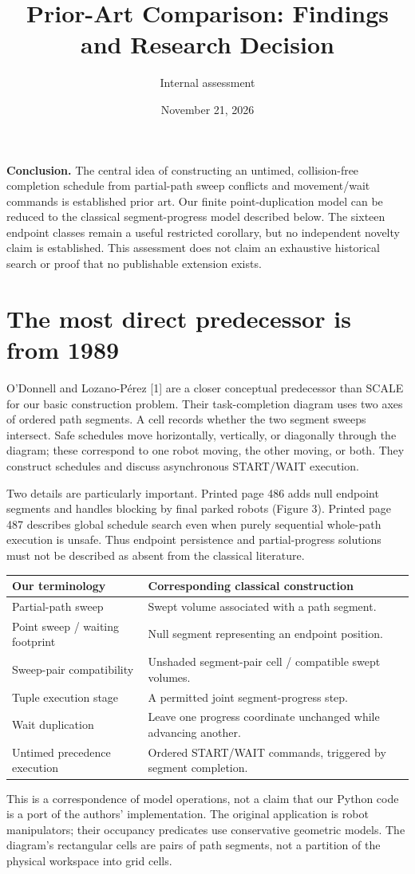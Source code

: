 \documentclass[11pt,a4paper]{article}
\title{Prior-Art Comparison: Findings and Research Decision}
\author{Internal assessment}
\date{November 21, 2026}
\begin{document}
\maketitle
\noindent\textbf{Conclusion.} The central idea of constructing an untimed,
collision-free completion schedule from partial-path sweep conflicts and
movement/wait commands is established prior art. Our finite point-duplication
model can be reduced to the classical segment-progress model described below.
The sixteen endpoint classes remain a useful restricted corollary, but no
independent novelty claim is established. This assessment does not claim an
exhaustive historical search or proof that no publishable extension exists.

\section{The most direct predecessor is from 1989}
O'Donnell and Lozano-P\'erez [1] are a closer conceptual predecessor than SCALE
for our basic construction problem. Their task-completion diagram uses two
axes of ordered path segments. A cell records whether the two segment sweeps
intersect. Safe schedules move horizontally, vertically, or diagonally through
the diagram; these correspond to one robot moving, the other moving, or both.
They construct schedules and discuss asynchronous START/WAIT execution.

Two details are particularly important. Printed page 486 adds null endpoint
segments and handles blocking by final parked robots (Figure 3). Printed page
487 describes global schedule search even when purely sequential whole-path
execution is unsafe. Thus endpoint persistence and partial-progress solutions
must not be described as absent from the classical literature.

\begin{center}\small
\begin{tabular}{p{48mm}p{91mm}}\toprule
Our terminology & Corresponding classical construction\\\midrule
Partial-path sweep & Swept volume associated with a path segment.\\
Point sweep / waiting footprint & Null segment representing an endpoint position.\\
Sweep-pair compatibility & Unshaded segment-pair cell / compatible swept volumes.\\
Tuple execution stage & A permitted joint segment-progress step.\\
Wait duplication & Leave one progress coordinate unchanged while advancing another.\\
Untimed precedence execution & Ordered START/WAIT commands, triggered by segment completion.\\\bottomrule
\end{tabular}
\end{center}
This is a correspondence of model operations, not a claim that our Python code
is a port of the authors' implementation. The original application is robot
manipulators; their occupancy predicates use conservative geometric models.
The diagram's rectangular cells are pairs of path segments, not a partition
of the physical workspace into grid cells.
\end{document}
